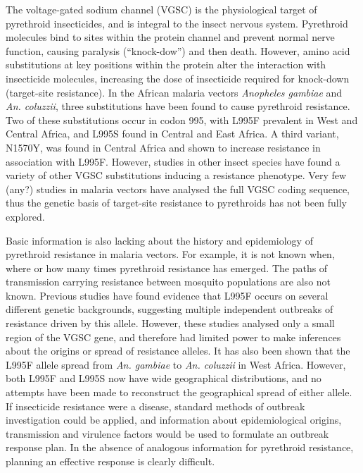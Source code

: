\documentclass[a4paper,11pt,abstracton,hidelinks]{scrartcl}
\begin{document}
The voltage-gated sodium channel (VGSC) is the physiological target of pyrethroid insecticides, and is integral to the insect nervous system. 
%
Pyrethroid molecules bind to sites within the protein channel and prevent normal nerve function, causing paralysis (``knock-dow'') and then death. 
%
However, amino acid substitutions at key positions within the protein alter the interaction with insecticide molecules, increasing the dose of insecticide required for knock-down (target-site resistance). 
%
In the African malaria vectors \textit{Anopheles gambiae} and \textit{An. coluzzii}, three substitutions have been found to cause pyrethroid resistance. 
%
Two of these substitutions occur in codon 995, with L995F prevalent in West and Central Africa, and L995S found in Central and East Africa. 
%
A third variant, N1570Y, was found in Central Africa and shown to increase resistance in association with L995F. 
%
However, studies in other insect species have found a variety of other VGSC substitutions inducing a resistance phenotype. 
%
Very few (any?) studies in malaria vectors have analysed the full VGSC coding sequence, thus the genetic basis of target-site resistance to pyrethroids has not been fully explored.


Basic information is also lacking about the history and epidemiology of pyrethroid resistance in malaria vectors. 	
%
For example, it is not known when, where or how many times pyrethroid resistance has emerged. 
%
The paths of transmission carrying resistance between mosquito populations are also not known. 
%
Previous studies have found evidence that L995F occurs on several different genetic backgrounds, suggesting multiple independent outbreaks of resistance driven by this allele. 
%
However, these studies analysed only a small region of the VGSC gene, and therefore had limited power to make inferences about the origins or spread of resistance alleles. 
%
It has also been shown that the L995F allele spread from \textit{An. gambiae} to \textit{An. coluzzii} in West Africa. 
%
However, both L995F and L995S now have wide geographical distributions, and no attempts have been made to reconstruct the geographical spread of either allele. 
%
If insecticide resistance were a disease, standard methods of outbreak investigation could be applied, and information about epidemiological origins, transmission and virulence factors would be used to formulate an outbreak response plan. 
%
In the absence of analogous information for pyrethroid resistance, planning an effective response is clearly difficult.
\end{document}
